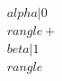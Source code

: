 \documentclass[preview]{standalone}
\begin{document}
\begin{align*}
\quad\\alpha|0\quad\\rangle + \quad\\beta|1\quad\\rangle
\end{align*}
\end{document}

